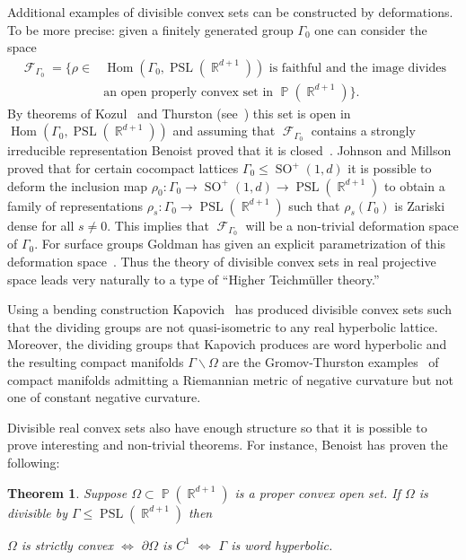 \documentclass[12pt]{amsart}
\theoremstyle{plain}
\newtheorem{theorem}[proposition]{Theorem}
\theoremstyle{definition}
\theoremstyle{remark}
\begin{document}
Additional examples of divisible convex sets can be constructed by deformations. To be more precise: given a finitely generated group $\Gamma_0$ one can consider the space
\begin{align*}
\operatorname{\mathcal{F}}_{\Gamma_0} = \{  \rho \in & \operatorname{Hom}(\Gamma_0, \operatorname{PSL}(\operatorname{\mathbb{R}}^{d+1}))  \text{ is faithful and the image divides} \\
& \text{an open properly convex set in $\operatorname{\mathbb{P}}(\operatorname{\mathbb{R}}^{d+1})$} \}.
\end{align*}
By theorems of Kozul~\cite{K1968} and Thurston (see~\cite[Theorem 3.1]{G1988}) this set is open in $\operatorname{Hom}(\Gamma_0, \operatorname{PSL}(\operatorname{\mathbb{R}}^{d+1}))$ and assuming that $\operatorname{\mathcal{F}}_{\Gamma_0}$ contains a strongly irreducible representation Benoist proved that it is closed~\cite{B2005}. Johnson and Millson~\cite{JM1987} proved that for certain cocompact lattices $\Gamma_0 \leq \operatorname{SO}^+(1,d)$ it is possible to deform the inclusion map $\rho_0:\Gamma_0 \rightarrow \operatorname{SO}^+(1,d) \rightarrow \operatorname{PSL}(\operatorname{\mathbb{R}}^{d+1})$ to obtain a family of representations $\rho_s : \Gamma_0 \rightarrow \operatorname{PSL}(\operatorname{\mathbb{R}}^{d+1})$ such that $\rho_s(\Gamma_0)$ is Zariski dense for all $s \neq 0$. This implies that $\operatorname{\mathcal{F}}_{\Gamma_0}$ will be a non-trivial deformation space of $\Gamma_0$. For surface groups Goldman has given an explicit parametrization of this deformation space~\cite{G1990}. Thus the theory of divisible convex sets in real projective space leads very naturally to a type of ``Higher Teichm\"{u}ller theory.'' 

Using a bending construction Kapovich~\cite{K2007} has produced divisible convex sets such that the dividing groups are not quasi-isometric to any real hyperbolic lattice. Moreover, the dividing groups that Kapovich produces are word hyperbolic and the resulting compact manifolds $\Gamma \backslash \Omega$ are the Gromov-Thurston examples~\cite{GT1987} of compact manifolds admitting a Riemannian metric of negative curvature but not one of constant negative curvature. 

Divisible real convex sets also have enough structure so that it is possible to prove interesting and non-trivial theorems. For instance, Benoist has proven the following:

\begin{theorem}\cite[Theorem 1.1]{B2004}
Suppose $\Omega \subset \operatorname{\mathbb{P}}(\operatorname{\mathbb{R}}^{d+1})$ is a proper convex open set. If $\Omega$ is divisible by $\Gamma \leq \operatorname{PSL}(\operatorname{\mathbb{R}}^{d+1})$ then 
\begin{center}
$\Omega$ is strictly convex $\Leftrightarrow$ $\partial \Omega$ is $C^1$ $\Leftrightarrow$ $\Gamma$ is word hyperbolic.
\end{center}
\end{theorem}
\end{document}
